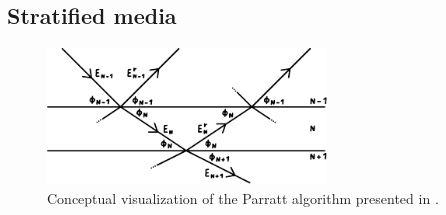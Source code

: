 \subsection{Stratified media}

\cite{Parratt_1954}

\begin{figure}[H]
	\centering
	\includegraphics[width=0.66\textwidth]{content/graphics/parratt.pdf}
	\caption{Conceptual visualization of the Parratt algorithm presented in \cite{Parratt_1954}.}
	\label{fig:parratt}
\end{figure}

\cite{xray}
